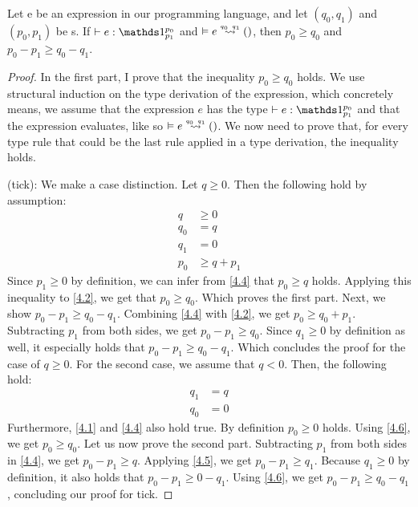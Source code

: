 \begin{theorem}
   Let e be an expression in our programming language, and let \((q_0, q_1)\) and \((p_0, p_1)\) be s. If \(\typing{}{e}{\ratype{\unit}{p_0}{p_1}}\) and \(\evals{}{e}{()}{q_0}{q_1}\), then \(p_0 \geq q_0\) and \(p_0 - p_1 \geq q_0 - q_1\).
\end{theorem}

\begin{proof}
In the first part, I prove that the inequality \(p_0 \geq q_0\) holds. We use structural induction on the type derivation of the expression, which concretely means, we assume that the expression \(e\) has the type \(\typing{}{e}{\ratype{\unit}{p_0}{p_1}}\) and that the expression evaluates, like so \(\evals{}{e}{()}{q_0}{q_1}\). We now need to prove that, for every type rule that could be the last rule applied in a type derivation, the inequality holds.

   (tick): We make a case distinction. Let \(q \geq 0\). Then the following hold by assumption:
   \begin{align}
      q     &\geq 0 \label{4.1}\\
      q_0   &= q \label{4.2}\\
      q_1   &= 0 \label{4.3}\\
      p_0   &\geq q + p_1 \label{4.4}
   \end{align}
   Since \(p_1 \geq 0\) by definition, we can infer from \ref{4.4} that \(p_0 \geq q\) holds. Applying this inequality to \ref{4.2}, we get that \(p_0 \geq q_0\). Which proves the first part.
   Next, we show \(p_0 - p_1 \geq q_0 - q_1\). Combining \ref{4.4} with \ref{4.2}, we get \(p_0 \geq q_0 + p_1\). Subtracting \(p_1\) from both sides, we get \(p_0 - p_1 \geq q_0\). Since \(q_1 \geq 0\) by definition as well, it especially holds that \(p_0 - p_1 \geq q_0 - q_1\). Which concludes the proof for the case of \(q \geq 0\).
   For the second case, we assume that \(q < 0\). Then, the following hold:
   \begin{align}
      q_1   &= q \label{4.5}\\
      q_0   &= 0 \label{4.6}
   \end{align}
   Furthermore, \ref{4.1} and \ref{4.4} also hold true. By definition \(p_0 \geq 0\) holds. Using \ref{4.6}, we get \(p_0 \geq q_0\). 
   Let us now prove the second part. Subtracting \(p_1\) from both sides in \ref{4.4}, we get \(p_0 - p_1 \geq q \). Applying \cref{4.5}, we get \(p_0 - p_1 \geq q_1\). Because \(q_1 \geq 0\) by definition, it also holds that \(p_0 - p_1 \geq 0 - q_1\). Using \ref{4.6}, we get \(p_0 - p_1 \geq q_0 - q_1\), concluding our proof for tick.
      

\end{proof}
